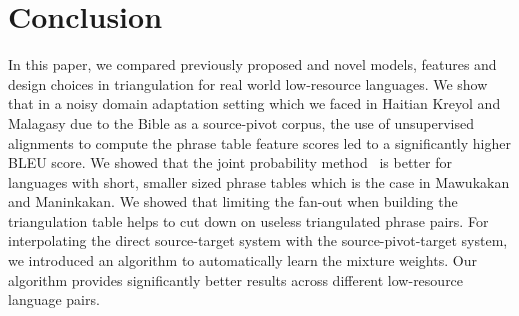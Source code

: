 \documentclass[11pt]{article}
\begin{document}
\section{Conclusion}
In this paper, we compared previously proposed and novel models, features and design choices in triangulation for real world low-resource languages. We show that in a noisy domain adaptation setting which we faced in Haitian Kreyol and Malagasy due to the Bible as a source-pivot corpus, the use of unsupervised alignments to compute the phrase table feature scores led to a significantly higher BLEU score. We showed that the joint probability method~\cite{Cohn:07} is better for languages with short, smaller sized phrase tables which is the case in Mawukakan and Maninkakan. We showed that limiting the fan-out when building the triangulation table helps to cut down on useless triangulated phrase pairs. For interpolating the direct source-target system with the source-pivot-target system, we introduced an algorithm to automatically learn the mixture weights. Our algorithm provides significantly better results across different low-resource language pairs.



\end{document}
